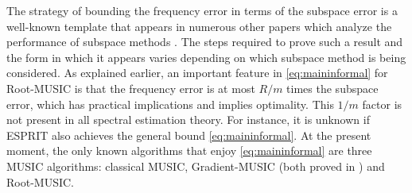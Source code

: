 \documentclass[11pt]{article}
\theoremstyle{definition}
\numberwithin{theorem}{section}
\numberwithin{equation}{section}
\def\C{\mathbb{C}}
\def\R{\mathbb{R}}
\def\T{\mathbb{T}}
\def\Z{\mathbb{Z}}
\renewcommand{\subset}{\subseteq}
\newcommand{\bfa}{{\boldsymbol a}}
\newcommand{\bfx}{{\boldsymbol x}}
\newcommand{\bfeta}{{\boldsymbol \eta}}
\newcommand{\bfphi}{{\boldsymbol \phi}}
\numberwithin{equation}{section}
\begin{document}





The strategy of bounding the frequency error in terms of the subspace error is a well-known template that appears in numerous other papers which analyze the performance of subspace methods \cite{rao1989performance,stoica1989music,krim1992operator,li2020super,li2022stability,yang2022nonasymptotic,gabet2025global,fannjiang2025optimality}. The steps required to prove such a result and the form in which it appears varies depending on which subspace method is being considered. As explained earlier, an important feature in \eqref{eq:maininformal} for Root-MUSIC is that the frequency error is at most $R/m$ times the subspace error, which has practical implications and implies optimality. This $1/m$ factor is not present in all spectral estimation theory. For instance, it is unknown if ESPRIT also achieves the general bound \eqref{eq:maininformal}. At the present moment, the only known algorithms that enjoy \eqref{eq:maininformal} are three MUSIC algorithms: classical MUSIC, Gradient-MUSIC (both proved in \cite{fannjiang2025optimality}) and Root-MUSIC. 
\end{document}
